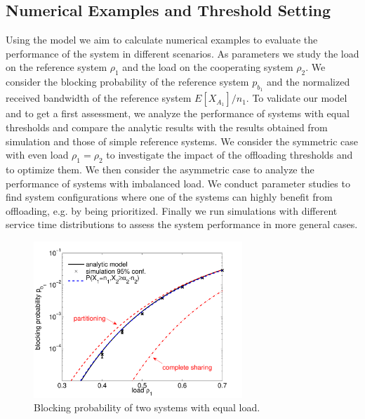 \subsection{Numerical Examples and Threshold Setting}\label{sec:aggregation:performance_model:numerical_examples}

Using the model we aim to calculate numerical examples to evaluate the performance of the system in different scenarios.
As parameters we study the load on the reference system $\rho_1$ and the load on the cooperating system $\rho_2$.
We consider the blocking probability of the reference system $p_{b_1}$ and the normalized received bandwidth of the reference system $E[X_{A_1}]/n_1$.
To validate our model and to get a first assessment, we analyze the performance of systems with equal thresholds and compare the analytic results with the results obtained from simulation and those of simple reference systems.
We consider the symmetric case with even load $\rho_1=\rho_2$ to investigate the impact of the offloading thresholds and to optimize them.
We then consider the asymmetric case to analyze the performance of systems with imbalanced load.
We conduct parameter studies to find system configurations where one of the systems can highly benefit from offloading, e.g. by being prioritized.
Finally we run simulations with different service time distributions to assess the system performance in more general cases.

\begin{figure}[tb]
	\centering
	\includegraphics[width=0.7\textwidth]{aggregation/performance_model/figures/m2_n20_comp}
 	\caption{Blocking probability of two systems with equal load.}
 	\label{fig:m2_comp}
\end{figure}

